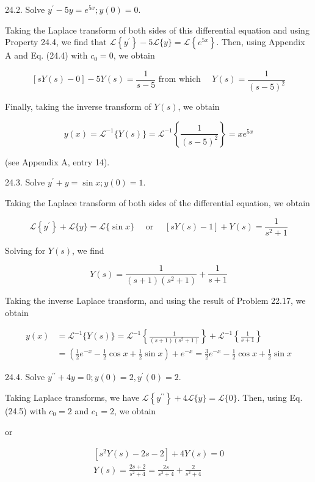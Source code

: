 \documentclass[10pt]{article}
\begin{document}
24.2. Solve $y^{\prime}-5 y=e^{5 x} ; y(0)=0$.

Taking the Laplace transform of both sides of this differential equation and using Property 24.4, we find that $\mathscr{L}\left\{y^{\prime}\right\}-5 \mathscr{L}\{y\}=\mathscr{L}\left\{e^{5 x}\right\}$. Then, using Appendix A and Eq. (24.4) with $c_{0}=0$, we obtain

$$
[s Y(s)-0]-5 Y(s)=\frac{1}{s-5} \text { from which } \quad Y(s)=\frac{1}{(s-5)^{2}}
$$

Finally, taking the inverse transform of $Y(s)$, we obtain

$$
y(x)=\mathscr{L}^{-1}\{Y(s)\}=\mathscr{L}^{-1}\left\{\frac{1}{(s-5)^{2}}\right\}=x e^{5 x}
$$

(see Appendix A, entry 14).

24.3. Solve $y^{\prime}+y=\sin x ; y(0)=1$.

Taking the Laplace transform of both sides of the differential equation, we obtain

$$
\mathscr{L}\left\{y^{\prime}\right\}+\mathscr{L}\{y\}=\mathscr{L}\{\sin x\} \quad \text { or } \quad[s Y(s)-1]+Y(s)=\frac{1}{s^{2}+1}
$$

Solving for $Y(s)$, we find

$$
Y(s)=\frac{1}{(s+1)\left(s^{2}+1\right)}+\frac{1}{s+1}
$$

Taking the inverse Laplace transform, and using the result of Problem 22.17, we obtain

$$
\begin{aligned}
y(x) & =\mathscr{L}^{-1}\{Y(s)\}=\mathscr{L}^{-1}\left\{\frac{1}{(s+1)\left(s^{2}+1\right)}\right\}+\mathscr{L}^{-1}\left\{\frac{1}{s+1}\right\} \\
& =\left(\frac{1}{2} e^{-x}-\frac{1}{2} \cos x+\frac{1}{2} \sin x\right)+e^{-x}=\frac{3}{2} e^{-x}-\frac{1}{2} \cos x+\frac{1}{2} \sin x
\end{aligned}
$$

24.4. Solve $y^{\prime \prime}+4 y=0 ; y(0)=2, y^{\prime}(0)=2$.

Taking Laplace transforms, we have $\mathscr{L}\left\{y^{\prime \prime}\right\}+4 \mathscr{L}\{y\}=\mathscr{L}\{0\}$. Then, using Eq. (24.5) with $c_{0}=2$ and $c_{1}=2$, we obtain

or

$$
\begin{gathered}
{\left[s^{2} Y(s)-2 s-2\right]+4 Y(s)=0} \\
Y(s)=\frac{2 s+2}{s^{2}+4}=\frac{2 s}{s^{2}+4}+\frac{2}{s^{2}+4}
\end{gathered}
$$
\end{document}
